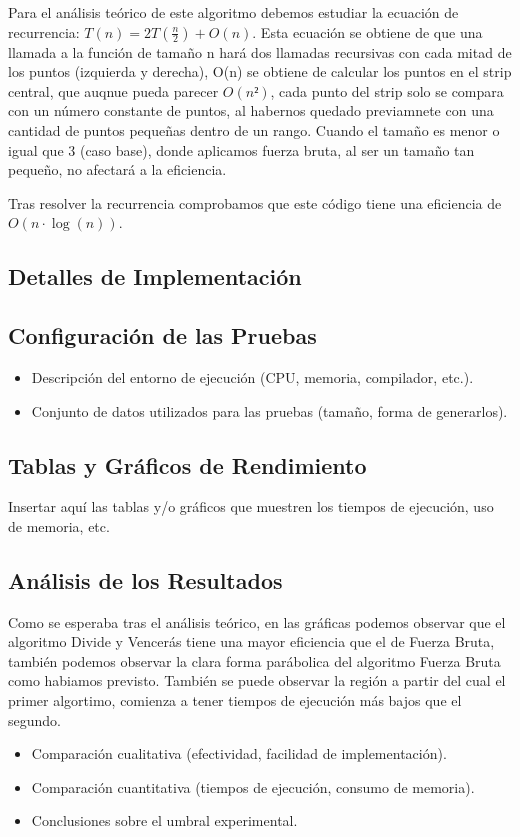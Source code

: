 \documentclass[a4paper,12pt]{article}
\begin{document}
Para el análisis teórico de este algoritmo debemos estudiar la ecuación de recurrencia: $T(n) = 2T(\frac{n}{2}) + O(n)$.
Esta ecuación se obtiene de que una llamada a la función de tamaño n hará dos llamadas recursivas con cada mitad de los puntos (izquierda y derecha),
O(n) se obtiene de calcular los puntos en el strip central, que auqnue pueda parecer $O(n²)$, cada punto del strip solo 
se compara con un número constante de puntos, al habernos quedado previamnete con una cantidad de puntos pequeñas dentro de un rango.
Cuando el tamaño es menor o igual que 3 (caso base), donde aplicamos 
fuerza bruta, al ser un tamaño tan pequeño, no afectará a la eficiencia.


Tras resolver la recurrencia comprobamos que este código tiene una eficiencia de $O(n\cdot \log (n))$.

\subsection{Detalles de Implementación}

\subsection{Configuración de las Pruebas}
\begin{itemize}
	\item Descripción del entorno de ejecución (CPU, memoria, compilador, etc.).
	\item Conjunto de datos utilizados para las pruebas (tamaño, forma de generarlos).
\end{itemize}

\subsection{Tablas y Gráficos de Rendimiento}
Insertar aquí las tablas y/o gráficos que muestren los tiempos de ejecución,
uso de memoria, etc.

\subsection{Análisis de los Resultados}
Como se esperaba tras el análisis teórico, en las gráficas podemos observar que el algoritmo Divide y Vencerás 
tiene una mayor eficiencia que el de Fuerza Bruta, también podemos observar la clara forma parábolica del algoritmo
Fuerza Bruta como habiamos previsto. También se puede observar la región a partir del cual el primer algortimo, comienza 
a tener tiempos de ejecución más bajos que el segundo.
\begin{itemize}
	\item Comparación cualitativa (efectividad, facilidad de implementación).
	\item Comparación cuantitativa (tiempos de ejecución, consumo de memoria).
	\item Conclusiones sobre el umbral experimental.
\end{itemize}
\end{document}
